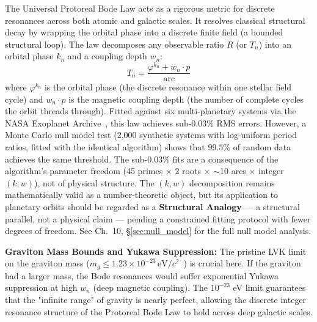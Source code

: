 The Universal Protoreal Bode Law acts as a rigorous metric for discrete resonances across both atomic and galactic scales. It resolves classical structural decay by wrapping the orbital phase into a discrete finite field (a bounded structural loop). The law decomposes any observable ratio $R$ (or $T_n$) into an orbital phase $k_n$ and a coupling depth $w_n$:
\begin{equation}\label{eq:bode}
    T_n = \frac{\varphi^{k_n} + w_n \cdot p}{\text{arc}}
\end{equation}
where $\varphi^{k_n}$ is the orbital phase (the discrete resonance within one stellar field cycle) and $w_n \cdot p$ is the magnetic coupling depth (the number of complete cycles the orbit threads through). Fitted against six multi-planetary systems via the NASA Exoplanet Archive~\cite{NASAExoplanet}, this law achieves sub-$0.03\%$ RMS errors. However, a Monte Carlo null model test (2,000 synthetic systems with log-uniform period ratios, fitted with the identical algorithm) shows that $99.5\%$ of random data achieves the same threshold. The sub-$0.03\%$ fits are a consequence of the algorithm's parameter freedom (45 primes $\times$ 2 roots $\times$ $\sim$10 arcs $\times$ integer $(k, w)$), not of physical structure. The $(k, w)$ decomposition remains mathematically valid as a number-theoretic object, but its application to planetary orbits should be regarded as a \textbf{Structural Analogy} --- a structural parallel, not a physical claim --- pending a constrained fitting protocol with fewer degrees of freedom. See Ch.~10, \S\ref{sec:null_model} for the full null model analysis.

\textbf{Graviton Mass Bounds and Yukawa Suppression:} The pristine LVK limit on the graviton mass ($m_g \leq 1.23 \times 10^{-23} \, \text{eV}/c^2$~\cite{LVK_GravitonMass}) is crucial here. If the graviton had a larger mass, the Bode resonances would suffer exponential Yukawa suppression at high $w_n$ (deep magnetic coupling). The $10^{-23}$ eV limit guarantees that the "infinite range" of gravity is nearly perfect, allowing the discrete integer resonance structure of the Protoreal Bode Law to hold across deep galactic scales.

